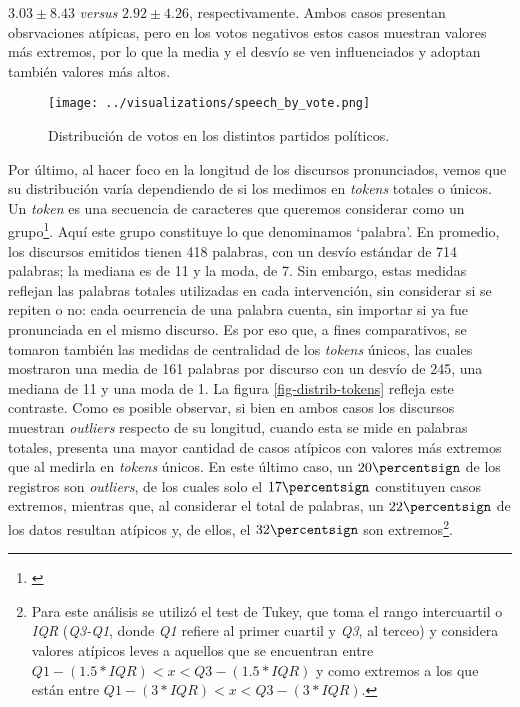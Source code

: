 $3.03\pm8.43$ \textit{versus} 
$2.92\pm4.26$, respectivamente.
Ambos casos presentan obsrvaciones atípicas, pero en los votos
negativos estos casos muestran valores más extremos, por lo que la media y el desvío se
ven influenciados y adoptan también valores más altos.

\begin{figure}[h!]
    \centering
    \texttt{[image: ../visualizations/speech\_by\_vote.png]}
    \caption{Distribución de votos en los distintos partidos políticos.}%
    \label{fig-distrib-speech}
\end{figure}

Por último, al hacer foco en la longitud de los discursos pronunciados, vemos que su
distribución varía dependiendo de si los medimos en \textit{tokens} totales o únicos.
Un \textit{token} es una secuencia de caracteres que queremos considerar como un
grupo\footnote{\citet*{bird2009natural}}. Aquí este grupo constituye lo que denominamos
`palabra'. En promedio, los discursos emitidos tienen 418 palabras, con un desvío
estándar de 714 palabras; la mediana es de 11 y la moda, de 7. Sin embargo, estas medidas
reflejan las palabras totales utilizadas en cada intervención, sin considerar si se repiten
o no: cada ocurrencia de una palabra cuenta, sin importar si ya fue pronunciada en el mismo
discurso. Es por eso que, a fines comparativos, se tomaron también las medidas de centralidad
de los \textit{tokens} únicos, las cuales mostraron una media de 161 palabras por discurso
con un desvío de 245, una mediana de 11 y una moda de 1. La figura \ref{fig-distrib-tokens}
refleja este contraste. Como es posible observar, si bien en ambos casos los discursos
muestran \textit{outliers} respecto de su longitud, cuando esta se mide en palabras
totales, presenta una mayor cantidad de casos atípicos con valores más extremos que
al medirla en \textit{tokens} únicos. En este último caso, un
$20\percentsign$ de los registros son \textit{outliers}, de los cuales solo el
$17\percentsign$ constituyen casos extremos, mientras que, al considerar
el total de palabras, un $22\percentsign$ de los datos resultan atípicos y,
de ellos, el $32\percentsign$ son extremos\footnote{Para este análisis se utilizó el
test de Tukey, que toma el rango intercuartil o \textit{IQR} (\textit{Q3-Q1}, donde
\textit{Q1} refiere al primer cuartil y \textit{Q3}, al terceo) y considera
valores atípicos leves a aquellos que se encuentran entre
$Q1 - (1.5 * IQR) < x < Q3 - (1.5 * IQR)$ y como extremos a los que están entre
$Q1 - (3 * IQR) < x < Q3 - (3 * IQR)$.}.

